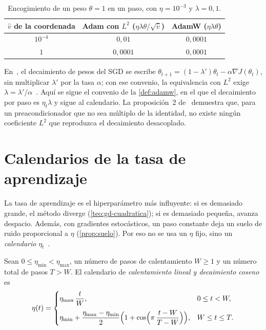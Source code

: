 \begin{table}[h]
\centering\small
\caption{Encogimiento de un peso $\theta=1$ en un paso, con $\eta=10^{-3}$ y $\lambda=0{,}1$.}\label{tab:adamw}
\begin{tabular}{@{}ccc@{}}
\toprule
$\hat v$ de la coordenada & Adam con $L^{2}$ ($\eta\lambda\theta/\sqrt{\hat v}$) & AdamW ($\eta\lambda\theta$) \\
\midrule
$10^{-4}$ & $0{,}01$ & $0{,}0001$ \\
$1$ & $0{,}0001$ & $0{,}0001$ \\
\bottomrule
\end{tabular}
\end{table}

\begin{observacion}[Convenios]
En~\cite{adamw}, el decaimiento de pesos del SGD se escribe $\theta_{t+1}=(1-\lambda')\theta_t-\alpha\nabla J(\theta_t)$, sin multiplicar $\lambda'$ por la tasa $\alpha$; con ese convenio, la equivalencia con $L^{2}$ exige $\lambda=\lambda'/\alpha$~\cite[proposición~1]{adamw}. Aquí se sigue el convenio de la \cref{def:adamw}, en el que el decaimiento por paso es $\eta_t\lambda$ y sigue al calendario. La proposición~2 de~\cite{adamw} demuestra que, para un preacondicionador que no sea múltiplo de la identidad, no existe ningún coeficiente $L^{2}$ que reproduzca el decaimiento desacoplado.
\end{observacion}

\addtocounter{definicion}{1}%

\section{Calendarios de la tasa de aprendizaje}

La tasa de aprendizaje es el hiperparámetro más influyente: si es demasiado grande, el método diverge (\cref{teo:gd-cuadratica}); si es demasiado pequeña, avanza despacio. Además, con gradientes estocásticos, un paso constante deja un suelo de ruido proporcional a $\eta$ (\cref{prop:suelo}). Por eso no se usa un $\eta$ fijo, sino un \emph{calendario} $\eta_t$~\cite[§12.11]{d2l}.

\begin{definicion}\label{def:coseno}
Sean $0\le\eta_{\min}<\eta_{\max}$, un número de pasos de calentamiento $W\ge 1$ y un número total de pasos $T>W$. El calendario de \emph{calentamiento lineal y decaimiento coseno} es
\[
\eta(t)=\begin{cases}
\eta_{\max}\,\dfrac{t}{W}, & 0\le t<W,\\[3mm]
\eta_{\min}+\dfrac{\eta_{\max}-\eta_{\min}}{2}\Bigl(1+\cos\Bigl(\pi\,\dfrac{t-W}{T-W}\Bigr)\Bigr), & W\le t\le T.
\end{cases}
\]
\end{definicion}

